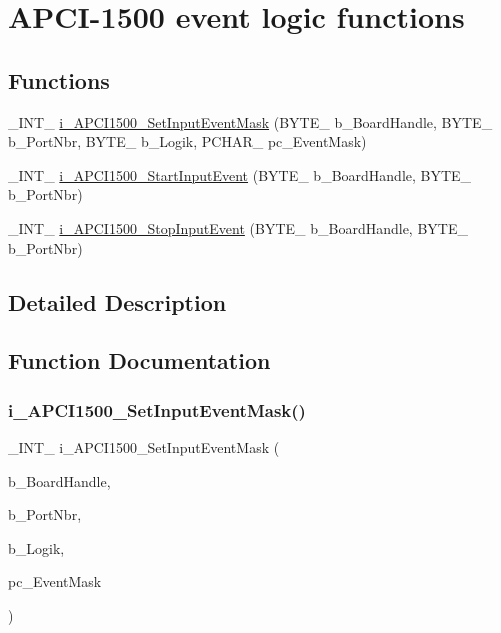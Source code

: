 \hypertarget{group___event_cmp_d_l_l}{}\section{A\+P\+C\+I-\/1500 event logic functions}
\label{group___event_cmp_d_l_l}
\subsection*{Functions}
\begin{DoxyCompactItemize}
\item 
\+\_\+\+I\+N\+T\+\_\+ \mbox{\hyperlink{group___event_cmp_d_l_l_ga3981a88b0acfbf8c585eb808cc7182c9}{i\+\_\+\+A\+P\+C\+I1500\+\_\+\+Set\+Input\+Event\+Mask}} (B\+Y\+T\+E\+\_\+ b\+\_\+\+Board\+Handle, B\+Y\+T\+E\+\_\+ b\+\_\+\+Port\+Nbr, B\+Y\+T\+E\+\_\+ b\+\_\+\+Logik, P\+C\+H\+A\+R\+\_\+ pc\+\_\+\+Event\+Mask)
\item 
\+\_\+\+I\+N\+T\+\_\+ \mbox{\hyperlink{group___event_cmp_d_l_l_gaeddb5990d85691c913a20c1e3b746977}{i\+\_\+\+A\+P\+C\+I1500\+\_\+\+Start\+Input\+Event}} (B\+Y\+T\+E\+\_\+ b\+\_\+\+Board\+Handle, B\+Y\+T\+E\+\_\+ b\+\_\+\+Port\+Nbr)
\item 
\+\_\+\+I\+N\+T\+\_\+ \mbox{\hyperlink{group___event_cmp_d_l_l_ga1edaa3a5c61d596a573f009e7c37fb4b}{i\+\_\+\+A\+P\+C\+I1500\+\_\+\+Stop\+Input\+Event}} (B\+Y\+T\+E\+\_\+ b\+\_\+\+Board\+Handle, B\+Y\+T\+E\+\_\+ b\+\_\+\+Port\+Nbr)
\end{DoxyCompactItemize}


\subsection{Detailed Description}


\subsection{Function Documentation}
\mbox{\label{group___event_cmp_d_l_l_ga3981a88b0acfbf8c585eb808cc7182c9}} 
\subsubsection{\texorpdfstring{i\_APCI1500\_SetInputEventMask()}{i\_APCI1500\_SetInputEventMask()}}
{\footnotesize\ttfamily \+\_\+\+I\+N\+T\+\_\+ i\+\_\+\+A\+P\+C\+I1500\+\_\+\+Set\+Input\+Event\+Mask (\begin{DoxyParamCaption}\item[{B\+Y\+T\+E\+\_\+}]{b\+\_\+\+Board\+Handle,  }\item[{B\+Y\+T\+E\+\_\+}]{b\+\_\+\+Port\+Nbr,  }\item[{B\+Y\+T\+E\+\_\+}]{b\+\_\+\+Logik,  }\item[{P\+C\+H\+A\+R\+\_\+}]{pc\+\_\+\+Event\+Mask }\end{DoxyParamCaption})}

